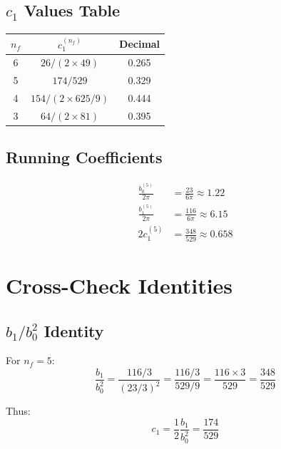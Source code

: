 \documentclass[11pt,a4paper]{article}
\theoremstyle{definition}
\begin{document}
\subsection{$c_1$ Values Table}
\label{subsec:app-table-c1}

\begin{center}
\begin{tabular}{ccc}
\toprule
$n_f$ & $c_1^{(n_f)}$ & Decimal \\
\midrule
6 & $26/(2\times49)$ & 0.265 \\
5 & $174/529$ & 0.329 \\
4 & $154/(2\times 625/9)$ & 0.444 \\
3 & $64/(2\times81)$ & 0.395 \\
\bottomrule
\end{tabular}
\end{center}

\subsection{Running Coefficients}
\label{subsec:app-running-coeff}

\begin{align}
\label{eq:app-88}
\frac{b_0^{(5)}}{2\pi} &= \frac{23}{6\pi} \approx 1.22 \\
\label{eq:app-89}
\frac{b_1^{(5)}}{2\pi} &= \frac{116}{6\pi} \approx 6.15 \\
\label{eq:app-90}
2c_1^{(5)} &= \frac{348}{529} \approx 0.658
\end{align}

\section{Cross-Check Identities}
\label{app:cross-check}

\subsection{$b_1/b_0^2$ Identity}
\label{subsec:app-id-b1b0}

For $n_f = 5$:
\begin{equation}
\label{eq:app-91}
\frac{b_1}{b_0^2} = \frac{116/3}{(23/3)^2} = \frac{116/3}{529/9} = \frac{116 \times 3}{529} = \frac{348}{529}
\end{equation}

Thus:
\begin{equation}
\label{eq:app-92}
c_1 = \frac{1}{2}\frac{b_1}{b_0^2} = \frac{174}{529}
\end{equation}
\end{document}
